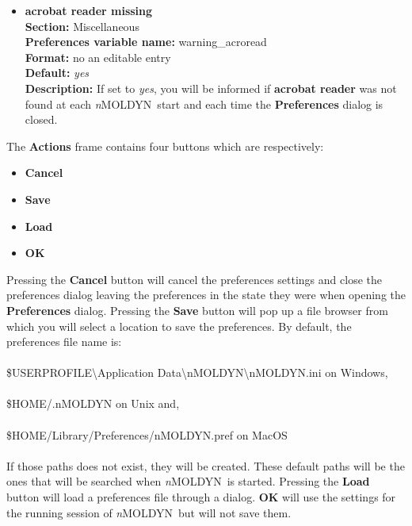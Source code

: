 \documentclass[a4paper,11pt]{report}
\newcommand{\NMOLDYN}{\textit{n}MOLDYN}
\begin{document}
\begin{itemize}
\hypertarget{preferences_warning_acroread}{}
\item \textbf{acrobat reader missing}\\
\textbf{Section:} Miscellaneous\\
\textbf{Preferences variable name:} warning\_acroread\\
\textbf{Format:} no an editable entry\\
\textbf{Default:} \textit{yes}\\
\textbf{Description:} If set to \textit{yes}, you will be informed if \textbf{acrobat reader} was not found at each \NMOLDYN\ start 
and each time the \textbf{Preferences} dialog is closed.
\end{itemize}

The \textbf{Actions} frame contains four buttons which are respectively:
\begin{itemize}
\item \textbf{Cancel}
\item \textbf{Save}
\item \textbf{Load}
\item \textbf{OK}
\end{itemize} 
Pressing the \textbf{Cancel} button will cancel the preferences settings and close the preferences dialog leaving the preferences in the state they
were when opening the \textbf{Preferences} dialog. 
Pressing the \textbf{Save} button will pop up a file browser from which you will select a location to save the preferences. 
By default, the preferences file name is:
\\\\
{\ttfamily \$USERPROFILE\textbackslash Application Data\textbackslash nMOLDYN\textbackslash nMOLDYN.ini} on Windows,
\\\\
{\ttfamily \$HOME/.nMOLDYN} on Unix and,
\\\\
{\ttfamily \$HOME/Library/Preferences/nMOLDYN.pref} on MacOS
\\\\
If those paths does not exist, they will be created. These default paths will be the ones that will be searched 
when \NMOLDYN\ is started. Pressing the \textbf{Load} button will load a preferences file through a dialog. \textbf{OK} will
use the settings for the running session of \NMOLDYN\ but will not save them.
\end{document}
